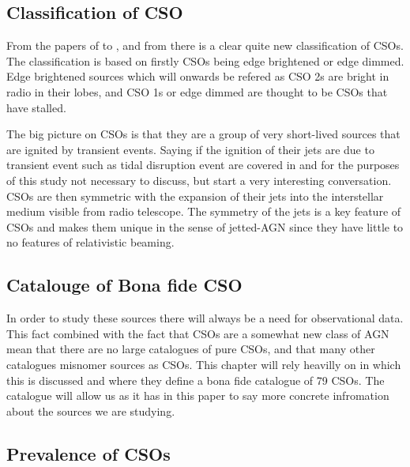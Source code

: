 \subsection{Classification of CSO}
From the papers of \cite{kiehlmann2023compact} to \cite{readhead2023compact}, and from \cite{sullivan2024smallscale} there is a clear quite new classification of CSOs. The classification is based on firstly CSOs being edge brightened or edge dimmed. Edge brightened sources which will onwards be refered as CSO 2s are bright in radio in their lobes, and CSO 1s or edge dimmed are thought to be CSOs that have stalled. 

The big picture on CSOs is that they are a group of very short-lived sources that are ignited by transient events. Saying if the ignition of their jets are due to transient event such as tidal disruption event are covered in \cite{sullivan2024smallscale} and for the purposes of this study not necessary to discuss, but start a very interesting conversation. CSOs are then symmetric with the expansion of their jets into the interstellar medium visible from radio telescope. The symmetry of the jets is a key feature of CSOs and makes them unique in the sense of jetted-AGN since they have little to no features of relativistic beaming.   


\subsection{Catalouge of Bona fide CSO}
In order to study these sources there will always be a need for observational data. This fact combined with the fact that CSOs are a somewhat new class of AGN mean that there are no large catalogues of pure CSOs, and that many other catalogues misnomer sources as CSOs. This chapter will rely heavilly on \cite{kiehlmann2023compact} in which this is discussed and where they define a bona fide catalogue of 79 CSOs. The catalogue will allow us as it has in this paper to say more concrete infromation about the sources we are studying.



\subsection{Prevalence of CSOs}







